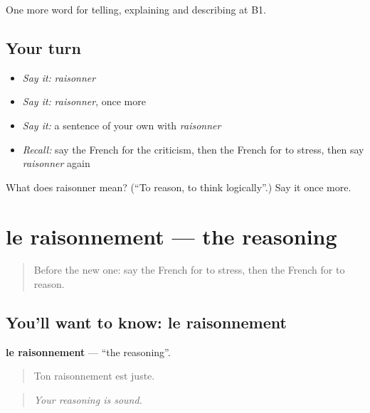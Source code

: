 \begin{grammarlens}[title={What you've built}]
One more word for telling, explaining and describing at B1.
\end{grammarlens}

\subsection*{Your turn}
\begin{itemize}
\raggedright
  \item \emph{Say it:} \emph{raisonner}
  \item \emph{Say it:} \emph{raisonner}, once more
  \item \emph{Say it:} a sentence of your own with \emph{raisonner}
  \item \emph{Recall:} say the French for the criticism, then the French for to stress, then say \emph{raisonner} again
\end{itemize}

\begin{tcolorbox}[breakable,colback=teal!4,colframe=teal!35!black,title={Before you move on}]
What does raisonner mean? (\textquotedblleft{}To reason, to think logically\textquotedblright{}.) Say it once more.
\end{tcolorbox}
\section[le raisonnement]{le raisonnement — the reasoning}

\label{lesson:FR-C344-raisonnement}



\begin{quote}
Before the new one: say the French for to stress, then the French for to reason.
\end{quote}

\subsection*{You'll want to know: le raisonnement}
\textbf{le raisonnement} — \textquotedblleft{}the reasoning\textquotedblright{}.

\begin{quote}
Ton raisonnement est juste.
\end{quote}

\begin{quote}
\emph{Your reasoning is sound.}
\end{quote}

